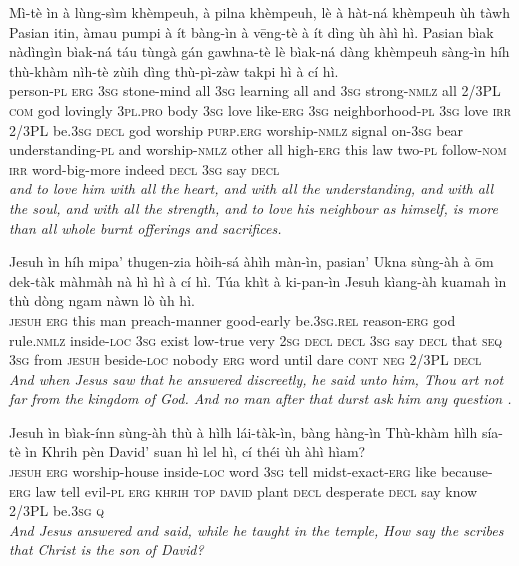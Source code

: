 \documentclass[11pt,a4paper]{article}
\begin{document}
\begin{exe}
\gll Mì-tè ìn à lùng-sìm khèmpeuh, à pilna khèmpeuh, lè à hàt-ná khèmpeuh ùh tàwh Pasian itin, àmau pumpi à ít bàng-ìn à vēng-tè à ít dìng ùh àhì hì. Pasian bìak nàdìngìn bìak-ná táu tùngà gán gawhna-tè lè bìak-ná dàng khèmpeuh sàng-ìn híh thù-khàm nìh-tè zùih dìng thù-pì-zàw takpi hì à cí hì. \\
     person-\textsc{pl} \textsc{erg} \textsc{3sg} stone-mind all \textsc{3sg} learning all and \textsc{3sg} strong-\textsc{nmlz} all 2/3PL \textsc{com} god lovingly \textsc{3pl}.\textsc{pro} body \textsc{3sg} love like-\textsc{erg} \textsc{3sg} neighborhood-\textsc{pl} \textsc{3sg} love \textsc{irr} 2/3PL be.\textsc{3sg} \textsc{decl} god worship \textsc{purp}.\textsc{erg} worship-\textsc{nmlz} signal on-\textsc{3sg} bear understanding-\textsc{pl} and worship-\textsc{nmlz} other all high-\textsc{erg} this law two-\textsc{pl} follow-\textsc{nom} \textsc{irr} word-big-more indeed \textsc{decl} \textsc{3sg} say \textsc{decl} \\
\glt \textcolor{kjvcolor}{\textit{and to love him with all the heart, and with all the understanding, and with all the soul, and with all the strength, and to love his neighbour as himself, is more than all whole burnt offerings and sacrifices.}}

\gll Jesuh ìn híh mipa' thugen-zia hòih-sá àhìh màn-ìn, pasian' Ukna sùng-àh à ōm dek-tàk màhmàh nà hì hì à cí hì. Túa khìt à ki-pan-ìn Jesuh kìang-àh kuamah ìn thù dòng ngam nàwn lò ùh hì. \\
     \textsc{jesuh} \textsc{erg} this man preach-manner good-early be.\textsc{3sg}.\textsc{rel} reason-\textsc{erg} god rule.\textsc{nmlz} inside-\textsc{loc} \textsc{3sg} exist low-true very \textsc{2sg} \textsc{decl} \textsc{decl} \textsc{3sg} say \textsc{decl} that \textsc{seq} \textsc{3sg} from \textsc{jesuh} beside-\textsc{loc} nobody \textsc{erg} word until dare \textsc{cont} \textsc{neg} 2/3PL \textsc{decl} \\
\glt \textcolor{kjvcolor}{\textit{And when Jesus saw that he answered discreetly, he said unto him, Thou art not far from the kingdom of God. And no man after that durst ask him any question .}}

\gll Jesuh ìn bìak-ínn sùng-àh thù à hìlh lái-tàk-ìn, bàng hàng-ìn Thù-khàm hìlh sía-tè ìn Khrih pèn David' suan hì lel hì, cí théi ùh àhì hìam? \\
     \textsc{jesuh} \textsc{erg} worship-house inside-\textsc{loc} word \textsc{3sg} tell midst-exact-\textsc{erg} like because-\textsc{erg} law tell evil-\textsc{pl} \textsc{erg} \textsc{khrih} \textsc{top} \textsc{david} plant \textsc{decl} desperate \textsc{decl} say know 2/3PL be.\textsc{3sg} \textsc{q} \\
\glt \textcolor{kjvcolor}{\textit{And Jesus answered and said, while he taught in the temple, How say the scribes that Christ is the son of David?}}


\end{exe}
\end{document}

